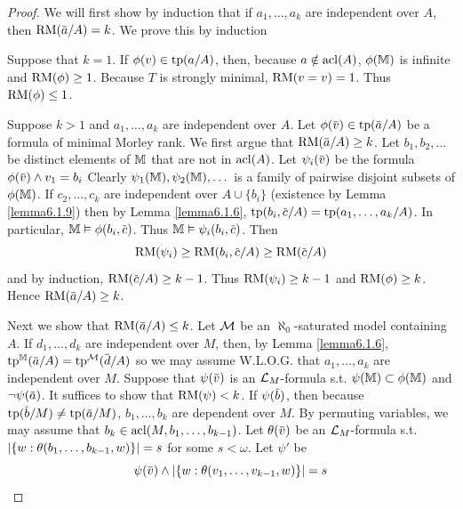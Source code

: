 \documentclass[11pt]{article}
\begin{document}
\begin{proof}
We will first show by induction that if \(a_1,\dots,a_k\) are independent over \(A\),
then \(\RM(\bara/A)=k\). We prove this by induction

Suppose that \(k=1\). If \(\phi(v)\in\operatorname{tp}(a/A)\), then, because \(a\notin\operatorname{acl}(A)\), \(\phi(\mathbb{M})\) is infinite
and \(\operatorname{RM}(\phi)\ge 1\). Because \(T\) is strongly minimal, \(\operatorname{RM}(v=v)=1\). Thus \(\operatorname{RM}(\phi)\le 1\).

Suppose \(k>1\) and \(a_1,\dots,a_k\) are independent over \(A\). Let \(\phi(\barv)\in\tp(\bara/A)\) be a
formula of minimal Morley rank. We first argue that \(\RM(\bara/A)\ge k\). Let \(b_1,b_2,\dots\) be
distinct elements of \(\mathbb{M}\) that are not in \(\operatorname{acl}(A)\).
Let \(\psi_i(\barv)\) be the formula \(\phi(\barv)\wedge v_1=b_i\)
Clearly \(\psi_1(\mathbb{M}),\psi_2(\mathbb{M}),\dots\) is a family of pairwise disjoint subsets of \(\phi(\mathbb{M})\). If \(c_2,\dots,c_k\)
are independent over \(A\cup\{b_i\}\) (existence by Lemma \ref{lemma6.1.9}) then by Lemma
\ref{lemma6.1.6}, \(\tp(b_i,\barc/A)=\tp(a_1,\dots,a_k/A)\). In particular, \(\M\vDash\phi(b_i,\barc)\).
Thus \(\M\vDash\psi_i(b_i,\barc)\). Then
\begin{equation*}
\RM(\psi_i)\ge\RM(b_i,\barc/A)\ge\RM(\barc/A)
\end{equation*}
and by induction, \(\RM(\barc/A)\ge k-1\). Thus \(\operatorname{RM}(\psi_i)\ge k-1\) and \(\operatorname{RM}(\phi)\ge k\).
Hence \(\RM(\bara/A)\ge k\).

Next we show that \(\RM(\bara/A)\le k\). Let \(\mathcal{M}\) be an \(\aleph_0\)-saturated model containing \(A\).
If \(d_1,\dots,d_k\) are independent over \(M\), then, by Lemma
\ref{lemma6.1.6}, \(\tp^{\M}(\bara/A)=\tp^{\calm}(\bard/A)\) so we may assume W.L.O.G. that \(a_1,\dots,a_k\) are
independent over \(M\). Suppose that \(\psi(\barv)\) is an \(\mathcal{L}_M\)-formula s.t. \(\psi(\mathbb{M})\subset\phi(\mathbb{M})\)
and \(\neg\psi(\bara)\).
It suffices to show that \(\operatorname{RM}(\psi)<k\).
If \(\psi(\barb)\), then because \(\tp(\barb/M)\neq\tp(\bara/M)\), \(b_1,\dots,b_k\) are dependent over \(M\). By permuting
variables, we may assume that \(b_k\in\operatorname{acl}(M,b_1,\dots,b_{k-1})\). Let \(\theta(\barv)\) be
an \(\mathcal{L}_M\)-formula s.t. \(\abs{\{w:\theta(b_1,\dots,b_{k-1},w)\}}=s\) for some \(s<\omega\). Let \(\psi'\) be
\begin{equation*}
\psi(\barv)\wedge\abs{\{w:\theta(v_1,\dots,v_{k-1},w)\}}=s
\end{equation*}
\end{proof}
\end{document}
